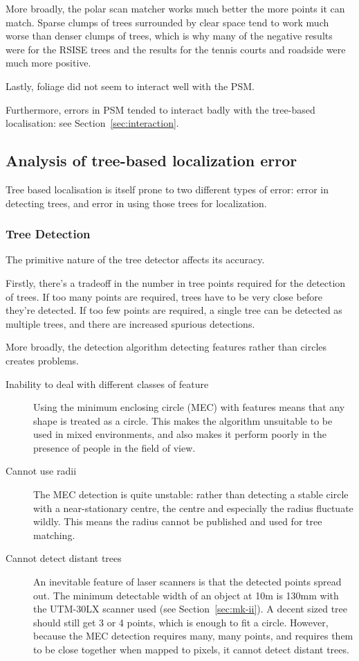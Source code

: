 \documentclass[12pt,oneside,a4paper,draft]{book}
\begin{document}
More broadly, the polar scan matcher works much better the more points
it can match. Sparse clumps of trees surrounded by clear space tend to
work much worse than denser clumps of trees, which is why many of the
negative results were for the RSISE trees and the results for the
tennis courts and roadside were much more positive.

Lastly, foliage did not seem to interact well with the PSM.

Furthermore, errors in PSM tended to interact badly with the
tree-based localisation: see Section~\ref{sec:interaction}.

\subsection{Analysis of tree-based localization error}
\label{sec:tree-error}

Tree based localisation is itself prone to two different types of
error: error in detecting trees, and error in using those trees for
localization.

\subsubsection{Tree Detection}
\label{sec:tree-detection}

The primitive nature of the tree detector affects its accuracy. 

Firstly, there's a tradeoff in the number in tree points required for
the detection of trees. If too many points are required, trees have to be very
close before they're detected. If too few points are required, a
single tree can be detected as multiple trees, and there are increased spurious detections.

More broadly, the detection algorithm detecting features rather than
circles creates problems.

\begin{description}
\item[Inability to deal with different classes of feature] Using the
  minimum enclosing circle (MEC) with features means that any shape is
  treated as a circle. This makes the algorithm unsuitable to be used
  in mixed environments, and also makes it perform poorly in the
  presence of people in the field of view.
\item[Cannot use radii] The MEC detection is quite unstable: rather
  than detecting a stable circle with a near-stationary centre, the
  centre and especially the radius fluctuate wildly. This means the
  radius cannot be published and used for tree matching.
\item[Cannot detect distant trees] An inevitable feature of laser
  scanners is that the detected points spread out. The minimum
  detectable width of an object at 10m is 130mm with the UTM-30LX
  scanner used (see Section~\ref{sec:mk-ii}). A decent sized tree
  should still get 3 or 4 points, which is enough to fit a
  circle. However, because the MEC detection requires many, many
  points, and requires them to be close together when mapped to
  pixels, it cannot detect distant trees.
\end{description}
\end{document}
